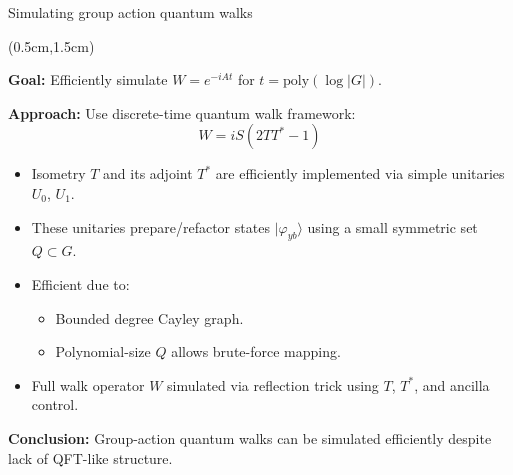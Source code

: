 \documentclass{beamer}
\theoremstyle{definition}
\begin{document}
\begin{frame}{Simulating group action quantum walks}
    
    \begin{textblock*}{12cm}(0.5cm,1.5cm)

                
        \textbf{Goal:} Efficiently simulate $W = e^{-iAt}$ for $t = \text{poly}(\log |G|)$.

        \medskip
        \textbf{Approach:} Use discrete-time quantum walk framework:
        \[
        W = iS(2TT^* - 1)
        \]

        \begin{itemize}
        \item Isometry $T$ and its adjoint $T^*$ are efficiently implemented via simple unitaries $U_0$, $U_1$.
        \item These unitaries prepare/refactor states $|\varphi_{yb}\rangle$ using a small symmetric set $Q \subset G$.
        \item Efficient due to:
            \begin{itemize}
            \item Bounded degree Cayley graph.
            \item Polynomial-size $Q$ allows brute-force mapping.
            \end{itemize}
        \item Full walk operator $W$ simulated via reflection trick using $T$, $T^*$, and ancilla control.
        \end{itemize}

        \textbf{Conclusion:} Group-action quantum walks can be simulated efficiently despite lack of QFT-like structure.


       

    \end{textblock*}

\end{frame}
\end{document}
